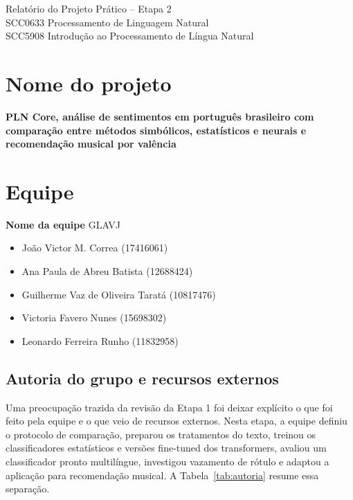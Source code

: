 \documentclass[11pt,a4paper]{article}
\begin{document}
\begin{center}
{\Large Relatório do Projeto Prático -- Etapa 2}\\[0.4em]
{\large SCC0633 Processamento de Linguagem Natural}\\[0.2em]
{\large SCC5908 Introdução ao Processamento de Língua Natural}\\[0.2em]
\end{center}

\section{Nome do projeto}

\textbf{PLN Core, análise de sentimentos em português brasileiro com comparação entre métodos simbólicos, estatísticos e neurais e recomendação musical por valência}

\section{Equipe}

\textbf{Nome da equipe} GLAVJ

\begin{itemize}
  \item João Victor M. Correa (17416061)
  \item Ana Paula de Abreu Batista (12688424)
  \item Guilherme Vaz de Oliveira Taratá (10817476)
  \item Victoria Favero Nunes (15698302)
  \item Leonardo Ferreira Runho (11832958)
\end{itemize}

\subsection{Autoria do grupo e recursos externos}

Uma preocupação trazida da revisão da Etapa 1 foi deixar explícito o que foi feito pela equipe e o que veio de recursos externos. Nesta etapa, a equipe definiu o protocolo de comparação, preparou os tratamentos do texto, treinou os classificadores estatísticos e versões fine-tuned dos transformers, avaliou um classificador pronto multilíngue, investigou vazamento de rótulo e adaptou a aplicação para recomendação musical. A Tabela~\ref{tab:autoria} resume essa separação.
\end{document}
